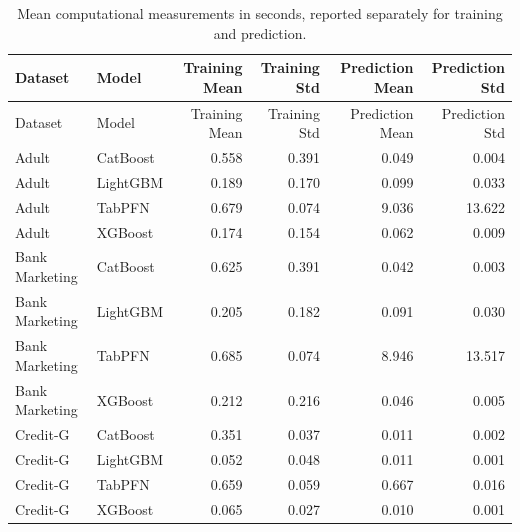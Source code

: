 \begin{longtable}{llNNNN}
\caption{Mean computational measurements in seconds, reported separately for training and prediction.}\label{tab:computational-performance}\\
\toprule
Dataset & Model & Training Mean & Training Std & Prediction Mean & Prediction Std \\
\midrule
\endfirsthead
\toprule
Dataset & Model & Training Mean & Training Std & Prediction Mean & Prediction Std \\
\midrule
\endhead
Adult & CatBoost & 0.558 & 0.391 & 0.049 & 0.004 \\
Adult & LightGBM & 0.189 & 0.170 & 0.099 & 0.033 \\
Adult & TabPFN & 0.679 & 0.074 & 9.036 & 13.622 \\
Adult & XGBoost & 0.174 & 0.154 & 0.062 & 0.009 \\
Bank Marketing & CatBoost & 0.625 & 0.391 & 0.042 & 0.003 \\
Bank Marketing & LightGBM & 0.205 & 0.182 & 0.091 & 0.030 \\
Bank Marketing & TabPFN & 0.685 & 0.074 & 8.946 & 13.517 \\
Bank Marketing & XGBoost & 0.212 & 0.216 & 0.046 & 0.005 \\
Credit-G & CatBoost & 0.351 & 0.037 & 0.011 & 0.002 \\
Credit-G & LightGBM & 0.052 & 0.048 & 0.011 & 0.001 \\
Credit-G & TabPFN & 0.659 & 0.059 & 0.667 & 0.016 \\
Credit-G & XGBoost & 0.065 & 0.027 & 0.010 & 0.001 \\
\bottomrule
\end{longtable}
